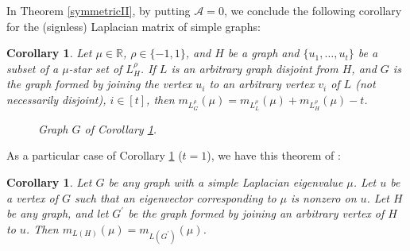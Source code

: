 \documentclass{amsart}
\newtheorem{corollary}[theorem]{Corollary}
\theoremstyle{remark}
\begin{document}
In Theorem \ref{symmetricII}, by putting $\mathcal{A}=0$, we conclude the following corollary for the (signless) Laplacian matrix of simple graphs:
\begin{corollary}\label{lap1}
Let $\mu\in \mathbb{R}$, $\rho\in \{-1,1\}$, and $H$ be a graph and $\{u_{1},\ldots,u_{t}\}$ be a subset of a $\mu$-star set of $L_{H}^{\rho}$. If $L$ is  an arbitrary graph disjoint from $H$,  and $G$ is the graph formed  by joining the vertex $u_{i}$ to an arbitrary vertex $v_{i}$ of  $L$ (not necessarily disjoint), $i\in [t]$, then $m_{L_{G}^{\rho}}(\mu)=m_{L_{L}^{\rho}}(\mu)+m_{L_{H}^{\rho}}(\mu)-t$.
\begin{figure}[H]
\centering
{}
\caption{Graph $G$ of Corollary \ref{lap1}.}
\end{figure}
\end{corollary}

As a particular case of Corollary \ref{lap1} ($t=1$), we have this theorem of {\rm \cite{Ne}}:
\begin{corollary}{\rm \cite{Ne}}
Let  $G$  be  any graph  with a simple  Laplacian eigenvalue $\mu$.  Let  $u$ be 
a vertex of $G$  such that an eigenvector corresponding to $\mu$  is nonzero on $u$. 
Let $H$ be  any graph,  and  let $G^{\prime}$ be the graph formed  by joining  an arbitrary 
vertex of  $H$ to $u$.  Then $m_{L(H)}(\mu)=m_{L(G^{\prime})}(\mu)$.
\end{corollary}
\end{document}
